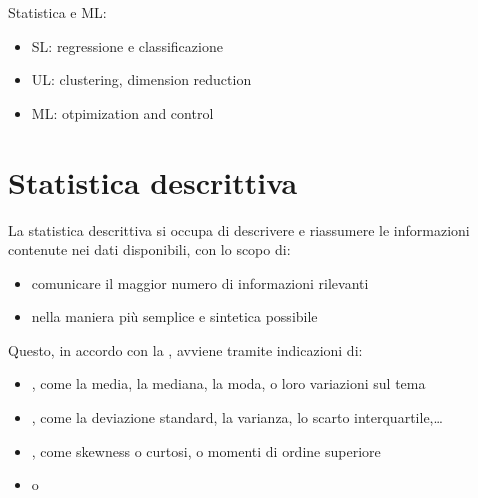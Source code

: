 \documentclass[letterpaper,10pt,italian]{jupyterBook}
\begin{document}
\sphinxAtStartPar
{} Statistica e ML:
\begin{itemize}
\item {} 
\sphinxAtStartPar
SL: regressione e classificazione

\item {} 
\sphinxAtStartPar
UL: clustering, dimension reduction

\item {} 
\sphinxAtStartPar
ML: otpimization and control

\end{itemize}

\sphinxstepscope


\chapter{Statistica descrittiva}
\label{\detokenize{ch/statistics/descriptive:statistica-descrittiva}}\label{\detokenize{ch/statistics/descriptive:statistics-hs-descriptive}}\label{\detokenize{ch/statistics/descriptive::doc}}
\sphinxAtStartPar
La statistica descrittiva si occupa di descrivere e riassumere le informazioni contenute nei dati disponibili, con lo scopo di:
\begin{itemize}
\item {} 
\sphinxAtStartPar
comunicare il maggior numero di informazioni rilevanti

\item {} 
\sphinxAtStartPar
nella maniera più semplice e sintetica possibile

\end{itemize}

\sphinxAtStartPar
Questo, in accordo con la  , avviene tramite indicazioni di:
\begin{itemize}
\item {} 
\sphinxAtStartPar
{}, come la media, la mediana, la moda, o loro variazioni sul tema

\item {} 
\sphinxAtStartPar
{}, come la deviazione standard, la varianza, lo scarto interquartile,…

\item {} 
\sphinxAtStartPar
{}, come skewness o curtosi, o momenti di ordine superiore

\item {} 
\sphinxAtStartPar
{} o   

\end{itemize}
\end{document}
